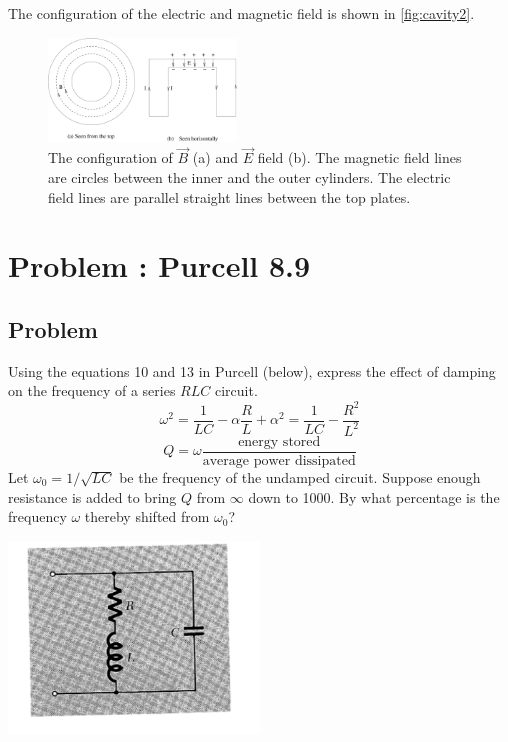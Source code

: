 \documentclass[solutions]{esg8022pset}
\begin{document}
  The configuration of the electric and magnetic field is shown in
  \autoref{fig:cavity2}.

  \begin{figure}[H]
    \centering
    \includegraphics[width = 5cm]{cavity2}
    \caption{The configuration of $\vec{B}$ (a) and $\vec{E}$ field (b).
      The magnetic field lines are circles between the inner and the outer
      cylinders.  The electric field lines are parallel straight lines
      between the top plates.}
    \label{fig:cavity2}
  \end{figure}

\section{Problem \thesection: Purcell 8.9}
\subsection{Problem}
  Using the equations 10 and 13 in Purcell (below), express the effect of
  damping on the frequency of a series $RLC$ circuit.
  \begin{equation*}
    \omega^2 = \frac{1}{LC} - \alpha\frac{R}{L} + \alpha^2 = \frac{1}{LC} - \frac{R^2}{L^2}
  \end{equation*}
  \begin{equation*}
    Q = \omega \frac{\text{energy stored}}{\text{average power dissipated}}
  \end{equation*}
  Let $\omega_0 = 1 / \sqrt{LC}$ be the frequency of the undamped circuit.
  Suppose enough resistance is added to bring $Q$ from $\infty$ down to
  1000.  By what percentage is the frequency $\omega$ thereby shifted from
  $\omega_0$?

  \begin{center}
    \includegraphics[width = 0.5\textwidth]{figpu809}
  \end{center}
\end{document}
